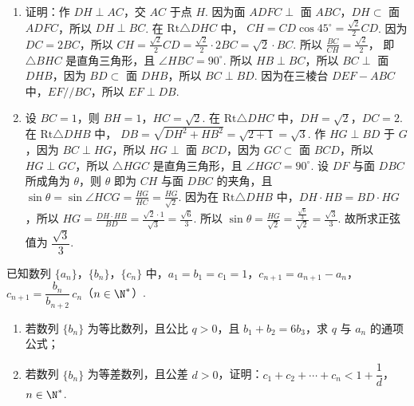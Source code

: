 \begin{solution}
\begin{enumerate}
\item 证明：作 \(DH\perp AC\)，交 \(AC\) 于点 \(H\).
因为面 \(ADFC\perp\) 面 \(ABC\)，\(DH\subset\) 面 \(ADFC\)，所以 \(DH\perp BC\).
在 \(\mathrm{Rt}\triangle DHC\) 中，
\(CH=CD\cos45^\circ=\frac{\sqrt2}{2}CD\).
因为 \(DC=2BC\)，所以
\(CH=\frac{\sqrt2}{2}CD=\frac{\sqrt2}{2}\cdot2BC=\sqrt2\cdot BC\).
所以
\(\frac{BC}{CH}=\frac{\sqrt2}{2}\)，
即 \(\triangle BHC\) 是直角三角形，且 \(\angle HBC=90^\circ\).
所以 \(HB\perp BC\)，所以 \(BC\perp\) 面 \(DHB\)，因为 \(BD\subset\) 面 \(DHB\)，所以 \(BC\perp BD\).
因为在三棱台 \(DEF-ABC\) 中，\(EF//BC\)，所以 \(EF\perp DB\).

\item 设 \(BC=1\)，则 \(BH=1\)，\(HC=\sqrt2\).
在 \(\mathrm{Rt}\triangle DHC\) 中，\(DH=\sqrt2\)，\(DC=2\).
在 \(\mathrm{Rt}\triangle DHB\) 中，
\(DB=\sqrt{DH^2+HB^2}=\sqrt{2+1}=\sqrt3\).
作 \(HG\perp BD\) 于 \(G\)，因为 \(BC\perp HG\)，所以 \(HG\perp\) 面 \(BCD\)，因为 \(GC\subset\) 面 \(BCD\)，所以 \(HG\perp GC\)，所以 \(\triangle HGC\) 是直角三角形，且 \(\angle HGC=90^\circ\).
设 \(DF\) 与面 \(DBC\) 所成角为 \(\theta\)，则 \(\theta\) 即为 \(CH\) 与面 \(DBC\) 的夹角，且
\(\sin\theta=\sin\angle HCG=\frac{HG}{HC}=\frac{HG}{\sqrt2}\).
因为在 \(\mathrm{Rt}\triangle DHB\) 中，\(DH\cdot HB=BD\cdot HG\)，所以
\(HG=\frac{DH\cdot HB}{BD}=\frac{\sqrt2\cdot1}{\sqrt3}=\frac{\sqrt6}{3}\).
所以
\(\sin\theta=\frac{HG}{\sqrt2}=\frac{\frac{\sqrt6}{3}}{\sqrt2}=\frac{\sqrt3}{3}\).
故所求正弦值为 \(\dfrac{\sqrt3}{3}\).
\end{enumerate}
\end{solution}

\begin{problem}
已知数列 \(\{a_n\}\)，\(\{b_n\}\)，\(\{c_n\}\) 中，\(a_1=b_1=c_1=1\)，\(c_{n+1}=a_{n+1}-a_n\)，\(c_{n+1}=\dfrac{b_n}{b_{n+2}}\,c_n\)（\(n\in\N^*\)）.

\begin{enumerate}
\item 若数列 \(\{b_n\}\) 为等比数列，且公比 \(q>0\)，且 \(b_1+b_2=6b_3\)，求 \(q\) 与 \(a_n\) 的通项公式；

\item 若数列 \(\{b_n\}\) 为等差数列，且公差 \(d>0\)，证明：\(c_1+c_2+\cdots+c_n<1+\dfrac1d\)，\(n\in\N^*\).
\end{enumerate}
\end{problem}

